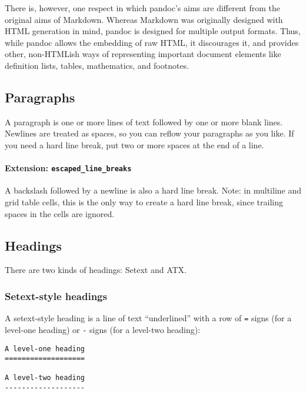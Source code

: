 \documentclass[]{article}
\begin{document}
There is, however, one respect in which pandoc's aims are different from
the original aims of Markdown. Whereas Markdown was originally designed
with HTML generation in mind, pandoc is designed for multiple output
formats. Thus, while pandoc allows the embedding of raw HTML, it
discourages it, and provides other, non-HTMLish ways of representing
important document elements like definition lists, tables, mathematics,
and footnotes.

\hypertarget{paragraphs}{%
\subsection{Paragraphs}\label{paragraphs}}

A paragraph is one or more lines of text followed by one or more blank
lines. Newlines are treated as spaces, so you can reflow your paragraphs
as you like. If you need a hard line break, put two or more spaces at
the end of a line.

\hypertarget{extension-escaped_line_breaks}{%
\paragraph{\texorpdfstring{Extension:
\texttt{escaped\_line\_breaks}}{Extension: escaped\_line\_breaks}}\label{extension-escaped_line_breaks}}

A backslash followed by a newline is also a hard line break. Note: in
multiline and grid table cells, this is the only way to create a hard
line break, since trailing spaces in the cells are ignored.

\hypertarget{headings}{%
\subsection{Headings}\label{headings}}

There are two kinds of headings: Setext and ATX.

\hypertarget{setext-style-headings}{%
\subsubsection{Setext-style headings}\label{setext-style-headings}}

A setext-style heading is a line of text ``underlined'' with a row of
\texttt{=} signs (for a level-one heading) or \texttt{-} signs (for a
level-two heading):

\begin{verbatim}
A level-one heading
===================

A level-two heading
-------------------
\end{verbatim}
\end{document}
